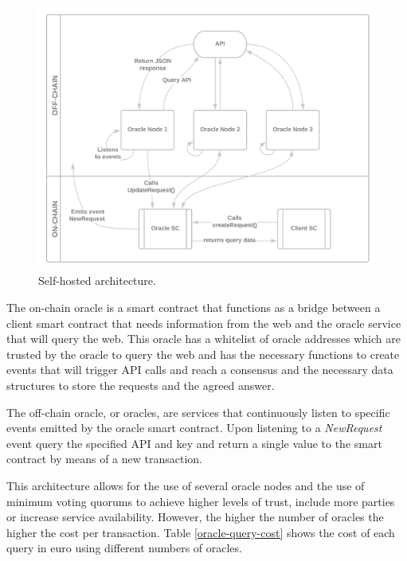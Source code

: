 \begin{figure}[t]
    \begin{center}
        \leavevmode
        \includegraphics[width=1\textwidth]{figures/self-hosted-architecture.png}
        \caption{Self-hosted architecture.}
        \label{fig:/figures/self-hosted-architecture}
    \end{center}
\end{figure}


The on-chain oracle is a smart contract that functions as a bridge between a client smart contract that needs information from the web and the oracle service that will query the web. This oracle has a whitelist of oracle addresses which are trusted by the oracle to query the web and has the necessary functions to create events that will trigger API calls and reach a consensus and the necessary data structures to store the requests and the agreed answer.

The off-chain oracle, or oracles, are services that continuously listen to specific events emitted by the oracle smart contract. Upon listening to a \textit{NewRequest} event query the specified API and key and return a single value to the smart contract by means of a new transaction.

This architecture allows for the use of several oracle nodes and the use of minimum voting quorums to achieve higher levels of trust, include more parties or increase service availability. However, the higher the number of oracles the higher the cost per transaction. Table \ref{oracle-query-cost} shows the cost of each query in euro using different numbers of oracles.


